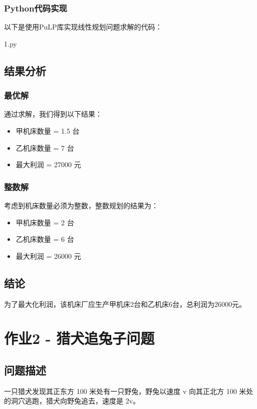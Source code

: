 \documentclass[bwprint]{cumcmthesis}
\begin{document}
\subsubsection{Python代码实现}

以下是使用PuLP库实现线性规划问题求解的代码：

\noindent 1.py
    

\subsection{结果分析}

\subsubsection{最优解}
通过求解，我们得到以下结果：
\begin{itemize}
    \item 甲机床数量 = 1.5 台
    \item 乙机床数量 = 7 台
    \item 最大利润 = 27000 元
\end{itemize}

\subsubsection{整数解}
考虑到机床数量必须为整数，整数规划的结果为：
\begin{itemize}
    \item 甲机床数量 = 2 台
    \item 乙机床数量 = 6 台
    \item 最大利润 = 26000 元
\end{itemize}

\subsection{结论}
为了最大化利润，该机床厂应生产甲机床2台和乙机床6台，总利润为26000元。

\section{作业2 - 猎犬追兔子问题}

\subsection{问题描述}
一只猎犬发现其正东方 100 米处有一只野兔，野兔以速度 v 向其正北方 100 米处的洞穴逃跑，猎犬向野兔追去，速度是 2v。
\end{document}
